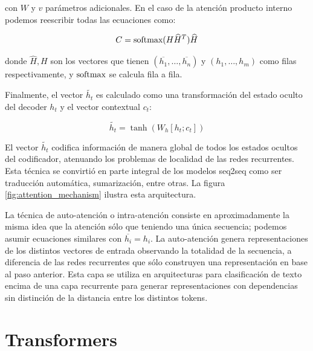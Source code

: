 %
\newcommand{\thicktilde}[1]{\mathbf{\tilde{\text{$#1$}}}}

con $W$ y $v$ parámetros adicionales. En el caso de la atención producto interno podemos reescribir todas las ecuaciones como:

\begin{equation}
    C = \text{softmax}(H \widehat{H}^T ) \widehat{H}
    \label{eq:attention_product}
\end{equation}

donde $\widehat{H}, H$ son los vectores que tienen $(\overline{h_1}, \ldots , \overline{h_n})$  y $(h_1, \ldots , h_m)$ como filas respectivamente, y $\text{softmax}$ se calcula fila a fila.

Finalmente, el vector $\widetilde{h_t}$ es calculado como una transformación del estado oculto del decoder $h_t$ y el vector contextual $c_t$:


\begin{equation*}
    \widetilde{h_t} = \tanh(W_h [h_t; c_t])
\end{equation*}


El vector $\widetilde{h_t}$ codifica información de manera global de todos los estados ocultos del codificador, atenuando los problemas de localidad de las redes recurrentes. Esta técnica se convirtió en parte integral de los modelos seq2seq como ser traducción automática, sumarización, entre otras. La figura \ref{fig:attention_mechanism} ilustra esta arquitectura.

La técnica de auto-atención o intra-atención \cite{parikh-etal-2016-decomposable} consiste en aproximadamente la misma idea que la atención sólo que teniendo una única secuencia; podemos asumir ecuaciones similares con $\overline{h_i} = h_i$. La auto-atención genera representaciones de los distintos vectores de entrada observando la totalidad de la secuencia, a diferencia de las redes recurrentes que sólo construyen una representación en base al paso anterior. Esta capa se utiliza en arquitecturas para clasificación de texto encima de una capa recurrente para generar representaciones con dependencias sin distinción de la distancia entre los distintos tokens.

\section{Transformers}

